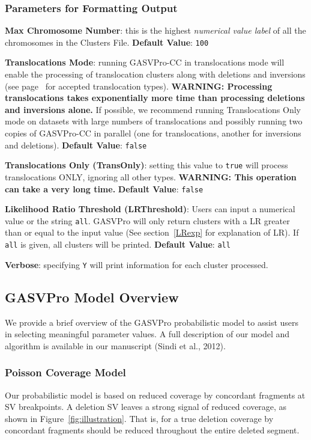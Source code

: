 \documentclass[11pt]{article}
\begin{document}
\subsubsection{Parameters for Formatting Output}
\begin{description}
\item{\bf Max Chromosome Number}:  this is the highest {\em numerical value label} of all the chromosomes in the Clusters File. {\bf Default Value}: \verb+100+ 
\item {\bf Translocations Mode}: running GASVPro-CC in translocations mode will enable the processing of translocation clusters along with deletions and inversions (see page~\pageref{structvartypes} for accepted translocation types). {\bf WARNING: Processing translocations takes exponentially more time than processing deletions and inversions alone.} If possible, we recommend running Translocations Only mode on datasets with large numbers of translocations and possibly running two copies of GASVPro-CC in parallel (one for translocations, another for inversions and deletions). {\bf Default Value}: \verb+false+

\item {\bf Translocations Only (TransOnly)}: setting this value to \verb+true+ will process translocations ONLY, ignoring all other types. {\bf WARNING: This operation can take a very long time.} {\bf Default Value}: \verb+false+
\item {\bf Likelihood Ratio Threshold (LRThreshold)}: Users can input a numerical value or the string \verb+all+. GASVPro will only return clusters with a LR greater than or equal to the input value (See section~\ref{LRexp} for explanation of LR). If \verb+all+ is given, all clusters will be printed. {\bf Default Value}: \verb+all+
\item {\bf Verbose}: specifying \verb+Y+ will print information for each cluster processed. 
\end{description}

\subsection{GASVPro Model Overview}
\label{sec:modeloverview}

We provide a brief overview of the GASVPro probabilistic model to assist users in selecting meaningful parameter values.  A full description of our model and algorithm is available in our manuscript (Sindi et al., 2012).

\subsubsection{Poisson Coverage Model}
Our probabilistic model is based on reduced coverage by concordant fragments at SV breakpoints. A deletion SV leaves a strong signal of reduced coverage, as shown in Figure~\ref{fig:illustration}. That is, for a true deletion coverage by concordant fragments should be reduced throughout the entire deleted segment. 
 
\end{document}
